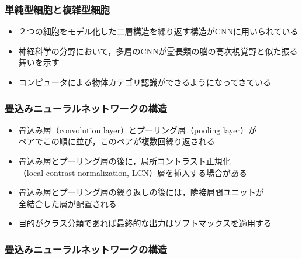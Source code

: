 \documentclass[dvipdfmx,11pt,notheorems]{beamer}
\theoremstyle{definition}
\begin{document}
\begin{frame}[fragile]\frametitle{単純型細胞と複雑型細胞}
\begin{itemize}
\item ２つの細胞をモデル化した二層構造を繰り返す構造がCNNに用いられている
\item 神経科学の分野において，多層のCNNが霊長類の脳の高次視覚野と似た振る舞いを示す
\item コンピュータによる物体カテゴリ認識ができるようになってきている
\end{itemize}
\end{frame}


\begin{frame}[fragile]\frametitle{畳込みニューラルネットワークの構造}


\begin{itemize}
\item 畳込み層（convolution layer）とプーリング層（pooling layer）が\\ペアでこの順に並び，このペアが複数回繰り返される
\item 畳込み層とプーリング層の後に，局所コントラスト正規化\\（local contrast normalization, LCN）層を挿入する場合がある
\item 畳込み層とプーリング層の繰り返しの後には，隣接層間ユニットが\\全結合した層が配置される
\item 目的がクラス分類であれば最終的な出力はソフトマックスを適用する
\end{itemize}
\end{frame}

\begin{frame}[fragile]\frametitle{畳込みニューラルネットワークの構造}

\end{frame}
\end{document}

